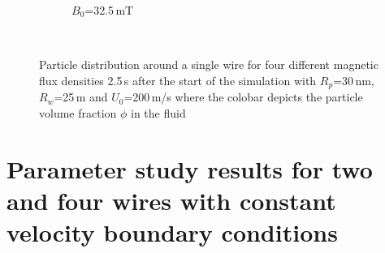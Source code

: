 \begin{figure}[H]
\begin{subfigure}{0.49\textwidth}
                \caption{$B_{0}$=32.5\,mT}%
        \end{subfigure}
        \\        
        \caption[Particle distribution around a single wire for different magnetic flux densities]{Particle distribution around a single wire for four different magnetic flux densities 2.5\,s after the start of the simulation with $R_{p}$=30\,nm, $R_{w}$=25\,\textmu m and $U_{0}$=200\,\textmu m/s where the colobar depicts the particle volume fraction $\phi$ in the fluid}
        \label{fig:Part_dist_wire}
  \end{figure}
\FloatBarrier
\section{Parameter study results for two and four wires with constant velocity boundary conditions}
\FloatBarrier
